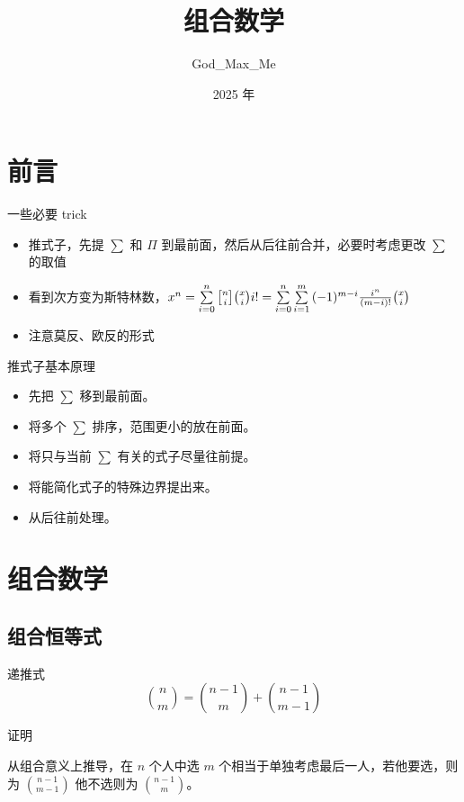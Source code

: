 \documentclass[UTF8]{beamer}
\title{组合数学}
\author{God\_Max\_Me}
\institute{Chengdu No.7 High School.}
\date{2025 年}
\begin{document}
  \maketitle
  \section{前言}

    \begin{frame}{一些必要 trick}
      \begin{itemize}
        \item
          推式子，先提 $\sum$ 和 $\Pi$
          到最前面，然后从后往前合并，必要时考虑更改 $\sum$ 的取值
        \item
          看到次方变为斯特林数，$x^n=\sum\limits_{i=0}^{n} {n \brack i} {x \choose i}i!=\sum\limits_{i=0}^{n}\sum\limits_{i=1}^m{(-1)^{m-i}{i^n \over (m-i)!}}{x \choose i}$
        \item
          注意莫反、欧反的形式
      \end{itemize}
    \end{frame}

    \begin{frame}{推式子基本原理}
      \begin{itemize}
        \item
          先把 $\sum$ 移到最前面。
        \item
          将多个 $\sum$ 排序，范围更小的放在前面。
        \item
          将只与当前 $\sum$ 有关的式子尽量往前提。
        \item
          将能简化式子的特殊边界提出来。
        \item
          从后往前处理。
      \end{itemize}
    \end{frame}
    
  \section{组合数学}
  \subsection{组合恒等式}

    \begin{frame}
      \begin{block}{递推式}
        $$
        {n \choose m}={n-1 \choose m}+{n-1 \choose m-1}
        $$
      \end{block}
      
      \pause
      证明

      从组合意义上推导，在 $n$ 个人中选 $m$
      个相当于单独考虑最后一人，若他要选，则为 ${n-1 \choose m-1}$ 他不选则为
      ${n-1 \choose m}$。
    \end{frame}
    
\end{document}
